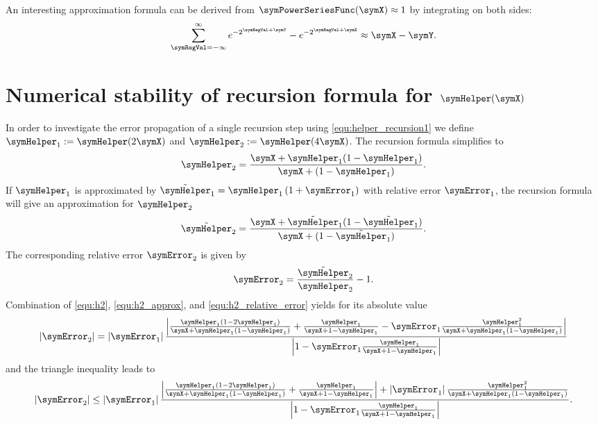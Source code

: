 \documentclass[a4paper]{scrartcl}
\begin{document}
An interesting approximation formula can be derived from $\symPowerSeriesFunc(\symX) \approx 1$ by integrating on both sides: 
\begin{equation}
\label{equ:approx_formula}
\sum_{\symRegVal = -\infty}^\infty
e^{-2^{\symRegVal+\symY}} - e^{-2^{\symRegVal+\symX}} \approx \symX - \symY.
\end{equation}

\section{Numerical stability of recursion formula for $\symHelper(\symX)$}
\label{app:helper_stable}
In order to investigate the error propagation of a single recursion step using \eqref{equ:helper_recursion1} we define $\symHelper_1 := \symHelper(2\symX)$ and $\symHelper_2 := \symHelper(4\symX)$. The recursion formula simplifies to
\begin{equation}
\label{equ:h2}
\symHelper_2 = \frac{\symX+\symHelper_1(1-\symHelper_1)}{\symX+(1-\symHelper_1)}.
\end{equation}
If $\symHelper_1$ is approximated by $\tilde{\symHelper}_1 = \symHelper_1\left(1+\symError_1\right)$ with relative error $\symError_1$, the recursion formula will give an approximation for $\symHelper_2$
\begin{equation}
\label{equ:h2_approx}
\tilde{\symHelper}_2 = 
\frac{\symX+\tilde{\symHelper}_1(1-\tilde{\symHelper}_1)}{\symX+(1-\tilde{\symHelper}_1)}.
\end{equation}
The corresponding relative error $\symError_2$ is given by
\begin{equation}
\label{equ:h2_relative_error}
\symError_2 = \frac{\tilde{\symHelper}_2}{\symHelper_2}-1.
\end{equation}
Combination of \eqref{equ:h2}, \eqref{equ:h2_approx}, and \eqref{equ:h2_relative_error} yields for its absolute value
\begin{equation}
\left|\symError_2\right|
=
\left|\symError_1\right|
\frac{
\left|
\frac{\symHelper_1\left(1-2\symHelper_1\right)}{\symX+\symHelper_1\left(1-\symHelper_1\right)}
+
\frac{\symHelper_1}{\symX+1-\symHelper_1}
-
\symError_1
\frac{\symHelper_1^2}{\symX+\symHelper_1\left(1-\symHelper_1\right)}
\right|
}{
\left|
1-
\symError_1
\frac{\symHelper_1}{\symX+1-\symHelper_1}
\right|
}
\end{equation}
and the triangle inequality leads to
\begin{equation}
\left|\symError_2\right|
\leq
\left|\symError_1\right|
\frac{
\left|
\frac{\symHelper_1\left(1-2\symHelper_1\right)}{\symX+\symHelper_1\left(1-\symHelper_1\right)}
+
\frac{\symHelper_1}{\symX+1-\symHelper_1}
\right|
+
\left|
\symError_1
\right|
\frac{\symHelper_1^2}{\symX+\symHelper_1\left(1-\symHelper_1\right)}
}{
\left|
1-
\symError_1
\frac{\symHelper_1}{\symX+1-\symHelper_1}
\right|
}.
\end{equation}
\end{document}
